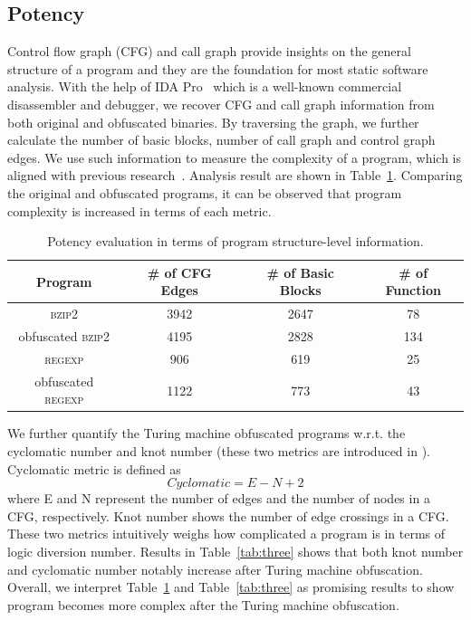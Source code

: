 \documentclass[lnicst]{svmultln}
\begin{document}

\subsection{Potency}
%
Control flow graph (CFG) and call graph provide insights on the general
structure of a program and they are the foundation for most static software
analysis. With the help of IDA Pro~\cite{ida} which is a well-known commercial
disassembler and debugger, we recover CFG and call graph information from both
original and obfuscated binaries. By traversing the graph, we further calculate
the number of basic blocks, number of call graph and control graph edges. We use
such information to measure the complexity of a program, which is aligned with
previous research~\cite{Chen}. Analysis result are shown in Table~\ref{tab:two}.
Comparing the original and obfuscated programs, it can be observed that program
complexity is increased in terms of each metric.

\begin{table}
  \centering
 \caption{Potency evaluation in terms of program structure-level information.}
 \label{tab:two}
 \begin{tabular}{|c|c|c|c|}
 \hline 
 \textbf{Program} & \textbf{\# of CFG Edges} & \textbf{\# of Basic Blocks} & \textbf{\# of Function} \\
 \hline
\textsc{bzip2} & 3942 & 2647 & 78 \\ 
 \hline
obfuscated \textsc{bzip2} & 4195 & 2828 & 134 \\
 \hline
\textsc{regexp} & 906 & 619 & 25 \\ 
 \hline
obfuscated \textsc{regexp} & 1122 & 773 & 43 \\
 \hline
\end{tabular}
\end{table}

We further quantify the Turing machine obfuscated programs w.r.t. the cyclomatic
number and knot number (these two metrics are introduced in
\cite{McCabe,Woodward}). Cyclomatic metric is defined as \[ Cyclomatic = E - N +
2 \] where E and N represent the number of edges and the number of nodes in a
CFG, respectively. Knot number shows the number of edge crossings in a CFG.
These two metrics intuitively weighs how complicated a program is in terms of
logic diversion number. Results in Table~\ref{tab:three} shows that both knot
number and cyclomatic number notably increase after Turing machine obfuscation.
Overall, we interpret Table~\ref{tab:two} and Table~\ref{tab:three} as promising
results to show program becomes more complex after the Turing machine
obfuscation.
\end{document}
